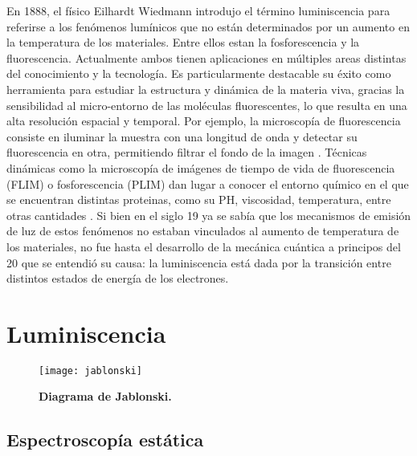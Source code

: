 En 1888, el físico Eilhardt Wiedmann introdujo el término luminiscencia para referirse a los fenómenos lumínicos que no están determinados por un aumento en la temperatura de los materiales.
Entre ellos estan la fosforescencia y la fluorescencia.
Actualmente ambos tienen aplicaciones en múltiples areas distintas del conocimiento y la tecnología. 
Es particularmente destacable su éxito como herramienta para estudiar la estructura y dinámica de la materia viva, gracias la sensibilidad al micro-entorno de las moléculas fluorescentes, lo que resulta en una alta resolución espacial y temporal. 
Por ejemplo, la microscopía de fluorescencia consiste en iluminar la muestra con una longitud de onda y detectar su fluorescencia en otra, permitiendo filtrar el fondo de la imagen \cite{valeur_introduction_2012}.
Técnicas dinámicas como la microscopía de imágenes de tiempo de vida de fluorescencia (FLIM) o fosforescencia (PLIM) dan lugar a conocer el entorno químico en el que se encuentran distintas proteinas, como su PH, viscosidad, temperatura, entre otras cantidades \cite{suhling_fluorescence_2015} \cite{baggaley_timeresolved_2015}.
Si bien en el siglo 19 ya se sabía que los mecanismos de emisión de luz de estos fenómenos no estaban vinculados al aumento de temperatura de los materiales, no fue hasta el desarrollo de la mecánica cuántica a principos del 20 que se entendió su causa: la luminiscencia está dada por la transición entre distintos estados de energía de los electrones.

\section{Luminiscencia}


\begin{figure}
    \centering
    \texttt{[image: jablonski]}
    \caption{\textbf{Diagrama de Jablonski.}}
    \label{fig:jablonski}
\end{figure}

\subsection{Espectroscopía estática}

